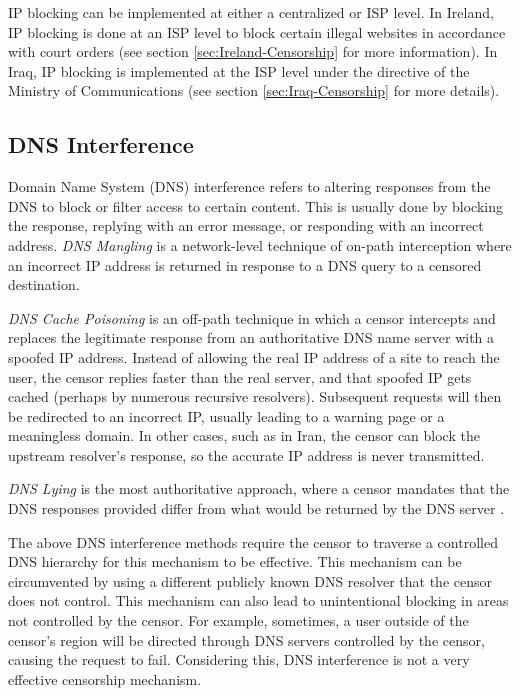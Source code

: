 IP blocking can be implemented at either a centralized or ISP level. In Ireland, IP blocking is done at an ISP level to block certain illegal websites in accordance with court orders (see section \ref{sec:Ireland-Censorship} for more information). In Iraq, IP blocking is implemented at the ISP level under the directive of the Ministry of Communications \cite{freedomhouseIraqFreedom} (see section \ref{sec:Iraq-Censorship} for more details).

\subsection{DNS Interference}

Domain Name System (DNS) interference refers to altering responses from the DNS to block or filter access to certain content. This is usually done by blocking the response, replying with an error message, or responding with an incorrect address. \textit{DNS Mangling} is a network-level technique of on-path interception where an incorrect IP address is returned in response to a DNS query to a censored destination. 

\textit{DNS Cache Poisoning} is an off-path technique in which a censor intercepts and replaces the legitimate response from an authoritative DNS name server with a spoofed IP address. Instead of allowing the real IP address of a site to reach the user, the censor replies faster than the real server, and that spoofed IP gets cached (perhaps by numerous recursive resolvers). Subsequent requests will then be redirected to an incorrect IP, usually leading to a warning page or a meaningless domain. In other cases, such as in Iran, the censor can block the upstream resolver's response, so the accurate IP address is never transmitted.

\textit{DNS Lying} is the most authoritative approach, where a censor mandates that the DNS responses provided differ from what would be returned by the DNS server \cite{rfc9505}.

The above DNS interference methods require the censor to traverse a controlled DNS hierarchy for this mechanism to be effective. This mechanism can be circumvented by using a different publicly known DNS resolver that the censor does not control. This mechanism can also lead to unintentional blocking in areas not controlled by the censor. For example, sometimes, a user outside of the censor's region will be directed through DNS servers controlled by the censor, causing the request to fail. Considering this, DNS interference is not a very effective censorship mechanism.

